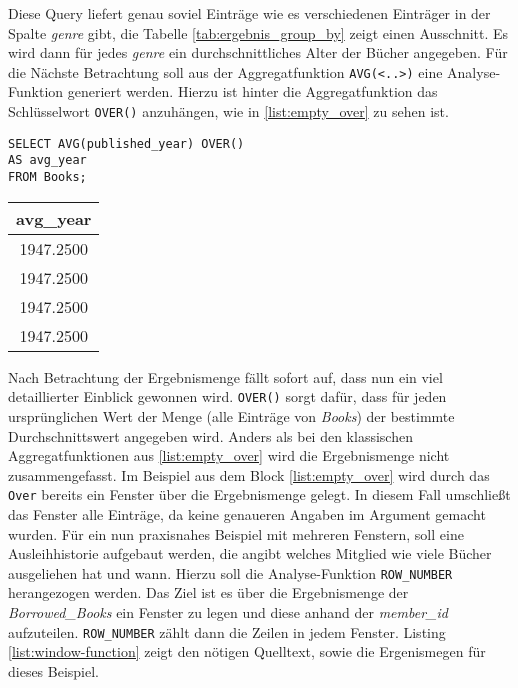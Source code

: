 Diese Query liefert genau soviel Einträge wie es verschiedenen Einträger in der Spalte
\textit{genre} gibt, die Tabelle \ref{tab:ergebnis_group_by} zeigt einen Ausschnitt.
Es wird dann für jedes \textit{genre} ein durchschnittliches Alter der Bücher angegeben.
Für die Nächste Betrachtung soll aus der Aggregatfunktion \texttt{AVG(<..>)} eine
Analyse-Funktion generiert werden. Hierzu ist hinter die Aggregatfunktion das
Schlüsselwort \texttt{OVER()} anzuhängen, wie in \ref{list:empty_over} zu sehen
ist.

\begin{minipage}{0.60\textwidth}
	\begin{lstlisting}
SELECT AVG(published_year) OVER()
AS avg_year
FROM Books;
	\end{lstlisting}
\end{minipage}
\hfill
\begin{minipage}{0.45\textwidth}
	\centering
	\begin{tabular}{|c|}
		\hline
		\textbf{avg\_year} \\
		\hline
		1947.2500          \\
		\hline
		1947.2500          \\
		\hline
		1947.2500          \\
		\hline
		1947.2500          \\
		\hline
	\end{tabular}
	 \label{tab:ergebnis_over}
\end{minipage}

Nach Betrachtung der Ergebnismenge fällt sofort auf, dass nun ein viel
detaillierter Einblick gewonnen wird. \texttt{OVER()} sorgt dafür, dass für jeden
ursprünglichen Wert der Menge (alle Einträge von \textit{Books}) der bestimmte
Durchschnittswert angegeben wird. Anders als bei den klassischen Aggregatfunktionen
aus \ref{list:empty_over} wird die Ergebnismenge nicht zusammengefasst. Im
Beispiel aus dem Block \ref{list:empty_over} wird durch das \texttt{Over} bereits
ein Fenster über die Ergebnismenge gelegt. In diesem Fall umschließt das Fenster
alle Einträge, da keine genaueren Angaben im Argument gemacht wurden. Für ein
nun praxisnahes Beispiel mit mehreren Fenstern, soll eine Ausleihhistorie aufgebaut
werden, die angibt welches Mitglied wie viele Bücher ausgeliehen hat und wann. Hierzu
soll die Analyse-Funktion \texttt{ROW\_NUMBER} herangezogen werden. Das Ziel ist
es über die Ergebnismenge der \textit{Borrowed\_Books} ein Fenster zu legen und
diese anhand der \textit{member\_id} aufzuteilen. \texttt{ROW\_NUMBER} zählt dann
die Zeilen in jedem Fenster. Listing \ref{list:window-function} zeigt den
nötigen Quelltext, sowie die Ergenismegen für dieses Beispiel.

